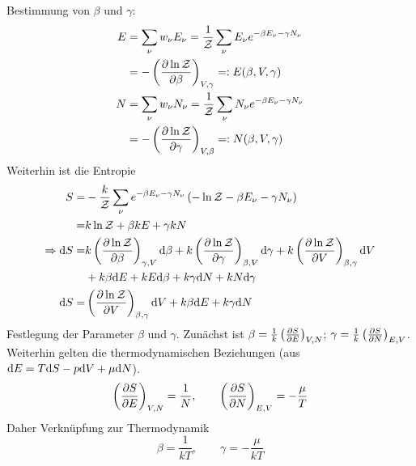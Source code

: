 \begin{enumerate}[A)]
    Bestimmung von $\beta$ und $\gamma$:
    \begin{equation}
        \begin{split}
            E &= \sum_\nu w_\nu E_\nu = \frac{1}{\mathcal{Z}} \sum_\nu E_\nu e^{- \beta E_\nu - \gamma N_\nu} \\
            &= - \left( \frac{\partial \ln \mathcal{Z}}{\partial \beta} \right)_{V, \gamma} =: E(\beta, V, \gamma) \\
            N &= \sum_\nu w_\nu N_\nu = \frac{1}{\mathcal{Z}} \sum_\nu N_\nu e^{- \beta E_\nu - \gamma N_\nu} \\
            &= - \left( \frac{\partial \ln \mathcal{Z}}{\partial \gamma} \right)_{V, \beta} =: N(\beta, V, \gamma)
        \end{split}
    \end{equation}
    Weiterhin ist die Entropie
    \begin{equation}
        \begin{split}
            S =& - \frac{k}{\mathcal{Z}} \sum_\nu e^{-\beta E_\nu - \gamma N_\nu} \left( - \ln \mathcal{Z} - \beta E_\nu - \gamma N_\nu \right) \\
            =& k \ln \mathcal{Z} + \beta k E + \gamma k N \\
            \Rightarrow  \mathrm{d} S =& k \left( \frac{\partial \ln \mathcal{Z}}{\partial \beta} \right)_{\gamma, V} \mathrm{d} \beta + k \left( \frac{\partial \ln \mathcal{Z}}{\partial \gamma} \right)_{\beta, V} \mathrm{d} \gamma +
            k \left( \frac{\partial \ln \mathcal{Z}}{\partial V} \right)_{\beta, \gamma} \mathrm{d} V \\
            & + k \beta \mathrm{d} E + k E \mathrm{d} \beta + k \gamma \mathrm{d} N + k N \mathrm{d} \gamma \\
            \mathrm{d} S =& \left( \frac{\partial \ln \mathcal{Z}}{\partial V} \right)_{\beta, \gamma} \mathrm{d} V + k \beta \mathrm{d} E + k \gamma \mathrm{d} N
        \end{split}
    \end{equation}
    Festlegung der Parameter $\beta$ und $\gamma$. Zunächst ist $\beta = \frac{1}{k} \left( \frac{\partial S}{\partial E} \right)_{V, N} $; $\gamma = \frac{1}{k} \left( \frac{\partial S}{\partial N} \right)_{E, V}$.
    Weiterhin gelten die thermodynamischen Beziehungen (aus $\mathrm{d} E = T \mathrm{d} S - p \mathrm{d} V + \mu \mathrm{d} N$).
    \begin{equation}
        \left( \frac{\partial S}{\partial E} \right)_{V, N} = \frac{1}{N}, \qquad \left( \frac{\partial S}{\partial N} \right)_{E, V} = - \frac{\mu}{T}
    \end{equation}
    Daher Verknüpfung zur Thermodynamik
    \begin{equation}
        \beta = \frac{1}{k T}, \qquad  \gamma = - \frac{\mu}{k T}
    \end{equation}
\end{enumerate}

